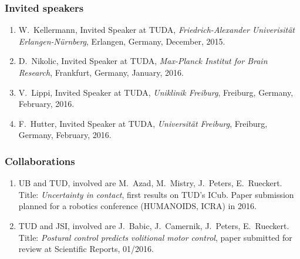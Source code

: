 

\subsubsection{Invited speakers}%
\begin{enumerate}
	\item W.~Kellermann, Invited Speaker at TUDA, \emph{Friedrich-Alexander Univerisit\"at Erlangen-N\"urnberg}, Erlangen, Germany, December, 2015.
	\item D.~Nikolic, Invited Speaker at TUDA, \emph{Max-Planck Institut for Brain Research}, Frankfurt, Germany, January, 2016.
	\item V.~Lippi, Invited Speaker at TUDA, \emph{Uniklinik Freiburg}, Freiburg, Germany, February, 2016.
	\item F.~Hutter, Invited Speaker at TUDA, \emph{Universit\"at Freiburg}, Freiburg, Germany, February, 2016.
\end{enumerate}

\subsubsection{Collaborations}

\begin{enumerate}%
	\item UB and TUD, involved are M.~Azad, M.~Mistry, J.~Peters, E.~Rueckert. Title: \emph{Uncertainty in contact}, first results on TUD's ICub. Paper submission planned for a robotics conference (HUMANOIDS, ICRA) in 2016. 
	\item TUD and JSI, involved are J.~Babic, J.~Camernik, J.~Peters, E.~Rueckert. Title: \emph{Postural control predicts volitional motor control}, paper submitted for review at Scientific Reports, 01/2016.
\end{enumerate}